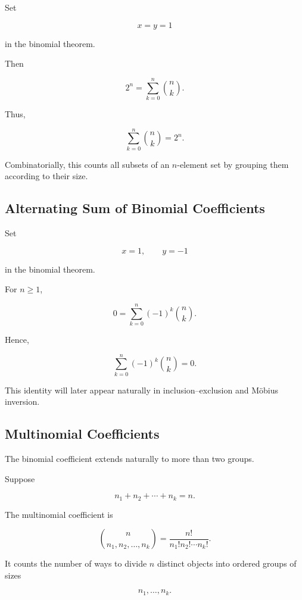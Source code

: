 Set

\[
x=y=1
\]

in the binomial theorem.

Then

\[
2^n
=
\sum_{k=0}^{n}\binom{n}{k}.
\]

Thus,

\[
\boxed{
\sum_{k=0}^{n}\binom{n}{k}
=
2^n.
}
\]

Combinatorially, this counts all subsets of an \(n\)-element set by
grouping them according to their size.

\subsection{Alternating Sum of Binomial Coefficients}
\label{subsec:alternating-binomial-sum}

Set

\[
x=1,
\qquad
y=-1
\]

in the binomial theorem.

For \(n\geq1\),

\[
0
=
\sum_{k=0}^{n}
(-1)^k\binom{n}{k}.
\]

Hence,

\[
\boxed{
\sum_{k=0}^{n}
(-1)^k\binom{n}{k}
=
0.
}
\]

This identity will later appear naturally in inclusion--exclusion and
Möbius inversion.

\subsection{Multinomial Coefficients}
\label{subsec:multinomial-coefficients}

The binomial coefficient extends naturally to more than two groups.

Suppose

\[
n_1+n_2+\cdots+n_k=n.
\]

The multinomial coefficient is

\[
\boxed{
\binom{n}{n_1,n_2,\ldots,n_k}
=
\frac{n!}{n_1!n_2!\cdots n_k!}.
}
\]

It counts the number of ways to divide \(n\) distinct objects into
ordered groups of sizes

\[
n_1,\ldots,n_k.
\]

